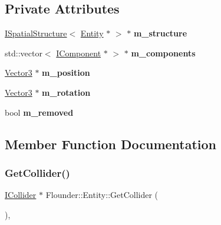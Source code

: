 \subsection*{Private Attributes}
\begin{DoxyCompactItemize}
\item 
\mbox{\label{class_flounder_1_1_entity_a9c80de90d69553e4956a05d473c3091b}} 
\hyperlink{class_flounder_1_1_i_spatial_structure}{I\+Spatial\+Structure}$<$ \hyperlink{class_flounder_1_1_entity}{Entity} $\ast$ $>$ $\ast$ {\bfseries m\+\_\+structure}
\item 
\mbox{\label{class_flounder_1_1_entity_a4c608af981d396f93b02283a54e73707}} 
std\+::vector$<$ \hyperlink{class_flounder_1_1_i_component}{I\+Component} $\ast$ $>$ $\ast$ {\bfseries m\+\_\+components}
\item 
\mbox{\label{class_flounder_1_1_entity_a9508453a40dab4bbd010e1509a68085c}} 
\hyperlink{class_flounder_1_1_vector3}{Vector3} $\ast$ {\bfseries m\+\_\+position}
\item 
\mbox{\label{class_flounder_1_1_entity_a0bbb2634a0945fb72c4592768766a867}} 
\hyperlink{class_flounder_1_1_vector3}{Vector3} $\ast$ {\bfseries m\+\_\+rotation}
\item 
\mbox{\label{class_flounder_1_1_entity_aa142c969240c448b714edcc9c7caded3}} 
bool {\bfseries m\+\_\+removed}
\end{DoxyCompactItemize}


\subsection{Member Function Documentation}
\mbox{\label{class_flounder_1_1_entity_ae56c103b9af5861733701dca4f30cee9}} 
\subsubsection{\texorpdfstring{Get\+Collider()}{GetCollider()}}
{\footnotesize\ttfamily \hyperlink{class_flounder_1_1_i_collider}{I\+Collider} $\ast$ Flounder\+::\+Entity\+::\+Get\+Collider (\begin{DoxyParamCaption}{ }\end{DoxyParamCaption})\hspace{0.3cm}{\ttfamily [override]}, {\ttfamily [virtual]}}



